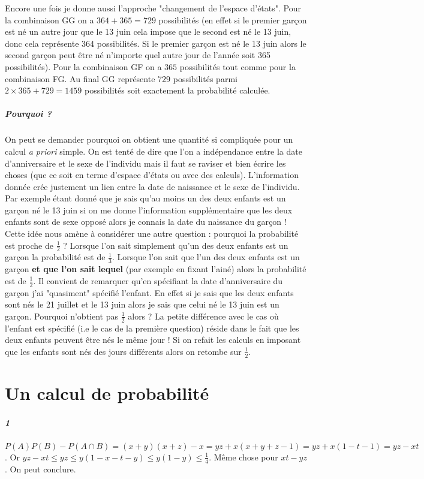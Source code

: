 \documentclass[10pt,a4paper]{article}
\begin{document}
Encore une fois je donne aussi l'approche "changement de l'espace d'états". Pour la combinaison GG on a $364+365=729$ possibilités (en effet si le premier garçon est né un autre jour que le 13 juin cela impose que le second est né le 13 juin, donc cela représente 364 possibilités. Si le premier garçon est né le 13 juin alors le second garçon peut être né n'importe quel autre jour de l'année soit 365 possibilités). Pour la combinaison GF on a $365$ possibilités tout comme pour la combinaison FG. Au final GG représente 
$729$ possibilités parmi $2\times 365+729=1459$ possibilités soit exactement la probabilité calculée.
\subparagraph{Pourquoi ?} On peut se demander pourquoi on obtient une quantité si compliquée pour un calcul \textit{a priori} simple. On est tenté de dire que l'on a indépendance entre la date d'anniversaire et le sexe de l'individu mais il faut se raviser et bien écrire les choses (que ce soit en terme d'espace d'états ou avec des calculs). L'information donnée crée justement un lien entre la date de naissance et le sexe de l'individu. Par exemple étant donné que je sais qu'au moins un des deux enfants est un garçon né le 13 juin si on me donne l'information supplémentaire que les deux enfants sont de sexe opposé alors je connais la date du naissance du garçon ! Cette idée nous amène à considérer une autre question : pourquoi la probabilité est proche de $\frac{1}{2}$ ? Lorsque l'on sait simplement qu'un des deux enfants est un garçon la probabilité est de $\frac{1}{3}$. Lorsque l'on sait que l'un des deux enfants est un garçon \textbf{et que l'on sait lequel} (par exemple en fixant l'ainé) alors la probabilité est de $\frac{1}{2}$. Il convient de remarquer qu'en spécifiant la date d'anniversaire du garçon j'ai "quasiment" spécifié l'enfant. En effet si je sais que les deux enfants sont nés le 21 juillet et le 13 juin alors je sais que celui né le 13 juin est un garçon. Pourquoi n'obtient pas $\frac{1}{2}$ alors ? La petite différence avec le cas où l'enfant est spécifié (i.e le cas de la première question) réside dans le fait que les deux enfants peuvent être nés le même jour ! Si on refait les calculs en imposant que les enfants sont nés des jours différents alors on retombe sur $\frac{1}{2}$.

\section{Un calcul de probabilité}
\subparagraph{1}
$P(A)P(B) - P(A\cap B) = (x+y)(x+z) - x = yz +x(x+y+z-1) = yz +x(1-t-1) = yz -xt$.
Or $yz-xt \le yz \le y(1-x-t-y) \le y(1-y) \le \frac{1}{4}$. Même chose pour $xt-yz$. On peut conclure.
\end{document}
